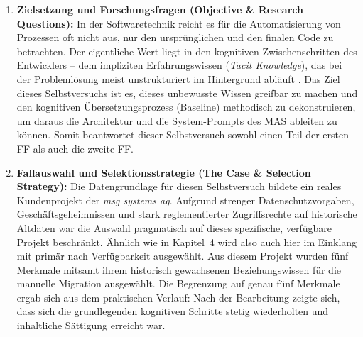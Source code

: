 \begin{enumerate}
    \item \textbf{Zielsetzung und Forschungsfragen (Objective \& Research Questions):} 
    In der Softwaretechnik reicht es für die Automatisierung von Prozessen oft nicht aus, nur den ursprünglichen und den finalen Code zu betrachten. Der eigentliche Wert liegt in den kognitiven Zwischenschritten des Entwicklers -- dem impliziten Erfahrungswissen (\textit{Tacit Knowledge}), das bei der Problemlösung meist unstrukturiert im Hintergrund abläuft \parencite{seamanQualitativeMethodsEmpirical1999}. Das Ziel dieses Selbstversuchs ist es, dieses unbewusste Wissen greifbar zu machen und den kognitiven Übersetzungsprozess (Baseline) methodisch zu dekonstruieren, um daraus die Architektur und die System-Prompts des \ac{MAS} ableiten zu können. Somit beantwortet dieser Selbstversuch sowohl einen Teil der ersten \ac{FF} als auch die zweite \ac{FF}.

    \item \textbf{Fallauswahl und Selektionsstrategie (The Case \& Selection Strategy):} 
    Die Datengrundlage für diesen Selbstversuch bildete ein reales Kundenprojekt der \textit{msg systems ag}. Aufgrund strenger Datenschutzvorgaben, Geschäftsgeheimnissen und stark reglementierter Zugriffsrechte auf historische Altdaten war die Auswahl pragmatisch auf dieses spezifische, verfügbare Projekt beschränkt. Ähnlich wie in Kapitel~4 wird also auch hier im Einklang mit \textcite{runesonGuidelinesConductingReporting2009} primär nach Verfügbarkeit ausgewählt. Aus diesem Projekt wurden fünf Merkmale mitsamt ihrem historisch gewachsenen Beziehungswissen für die manuelle Migration ausgewählt. Die Begrenzung auf genau fünf Merkmale ergab sich aus dem praktischen Verlauf: Nach der Bearbeitung zeigte sich, dass sich die grundlegenden kognitiven Schritte stetig wiederholten und inhaltliche Sättigung erreicht war.


\end{enumerate}
